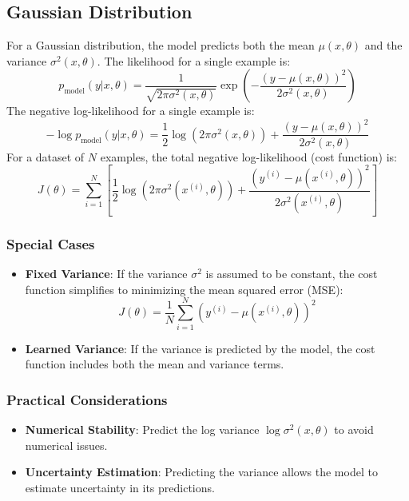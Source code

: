 \begin{notechapter}
\subsection{Gaussian Distribution}
For a Gaussian distribution, the model predicts both the mean \( \mu(x, \theta) \) and the variance \( \sigma^2(x, \theta) \). The likelihood for a single example is:
\[
p_{\text{model}}(y | x, \theta) = \frac{1}{\sqrt{2\pi\sigma^2(x, \theta)}} \exp\left(-\frac{(y - \mu(x, \theta))^2}{2\sigma^2(x, \theta)}\right)
\]
The negative log-likelihood for a single example is:
\[
-\log p_{\text{model}}(y | x, \theta) = \frac{1}{2} \log(2\pi\sigma^2(x, \theta)) + \frac{(y - \mu(x, \theta))^2}{2\sigma^2(x, \theta)}
\]
For a dataset of \( N \) examples, the total negative log-likelihood (cost function) is:
\[
J(\theta) = \sum_{i=1}^N \left[ \frac{1}{2} \log(2\pi\sigma^2(x^{(i)}, \theta)) + \frac{(y^{(i)} - \mu(x^{(i)}, \theta))^2}{2\sigma^2(x^{(i)}, \theta)} \right]
\]

\subsubsection{Special Cases}
\begin{itemize}
    \item \textbf{Fixed Variance}: If the variance \( \sigma^2 \) is assumed to be constant, the cost function simplifies to minimizing the mean squared error (MSE):
    \[
    J(\theta) = \frac{1}{N} \sum_{i=1}^N (y^{(i)} - \mu(x^{(i)}, \theta))^2
    \]
    \item \textbf{Learned Variance}: If the variance is predicted by the model, the cost function includes both the mean and variance terms.
\end{itemize}

\subsubsection{Practical Considerations}
\begin{itemize}
    \item \textbf{Numerical Stability}: Predict the log variance \( \log \sigma^2(x, \theta) \) to avoid numerical issues.
    \item \textbf{Uncertainty Estimation}: Predicting the variance allows the model to estimate uncertainty in its predictions.
\end{itemize}


\end{notechapter}
